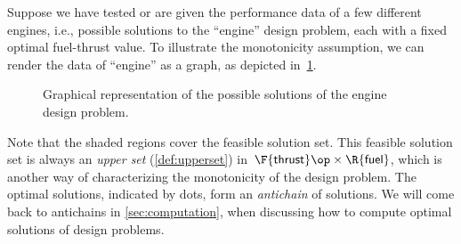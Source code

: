 \begin{example}
  Suppose we have tested or are given the performance data of a few different engines, i.e., possible solutions to the ``engine'' design problem, each with a fixed optimal fuel-thrust value. To illustrate the monotonicity assumption, we can render the data of ``engine'' as a graph, as depicted in~\cref{fig:solenginedp}.
  \begin{figure}[h!]
    \begin{center}
    \end{center}
    \caption{Graphical representation of the possible solutions of the engine design problem. \label{fig:solenginedp}}
  \end{figure}

  Note that the shaded regions cover the feasible solution set. This feasible solution set is always an \emph{upper set} (\cref{def:upperset}) in~$\F{\mathsf{thrust}}\op \times \R{\mathsf{fuel}}$, which is another way of characterizing the monotonicity of the design problem. The optimal solutions, indicated by dots, form an \emph{antichain} of solutions. We will come back to antichains in \cref{sec:computation}, when discussing how to compute optimal solutions of design problems.
\end{example}


